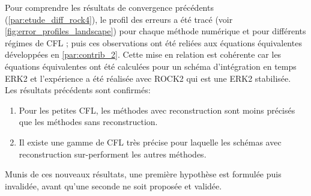 Pour comprendre les résultats de convergence précédents (\ref{par:etude_diff_rock4}), le profil des erreurs a été tracé (voir \ref{fig:error_profiles_landscape}) pour chaque méthode numérique et pour différents régimes de CFL ; puis 
ces observations ont été reliées aux équations équivalentes développées en \ref{par:contrib_2}. 
Cette mise en relation est cohérente car les équations équivalentes ont été calculées pour un schéma d'intégration en temps ERK2 et l'expérience a été réalisée avec 
ROCK2 qui est une ERK2 stabilisée.\\
Les résultats précédents sont confirmés:
\begin{enumerate}
    \item Pour les petites CFL, les méthodes avec reconstruction sont moins précisés que les méthodes sans reconstruction.
    \item Il existe une gamme de CFL très précise pour laquelle les schémas avec reconstruction sur-performent les autres méthodes.
\end{enumerate}
Munis de ces nouveaux résultats, une première hypothèse est formulée puis invalidée, avant qu’une seconde ne soit proposée et validée.
